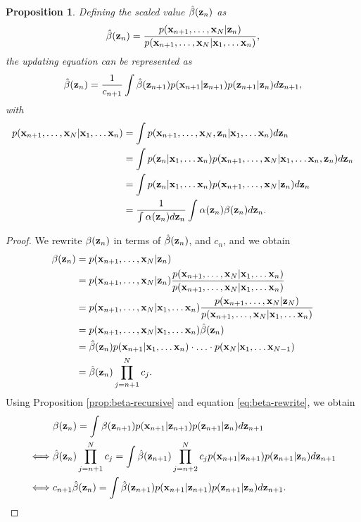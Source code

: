\documentclass[12pt, oneside]{book}
\numberwithin{equation}{section}
\newcommand{\x}{{\bf x}}
\newcommand{\z}{{\bf z}}
\newtheorem{proposition}{Proposition}[section]
\begin{document}
{\begin{proposition} \label{prop:beta-hat}
	Defining the scaled value $\hat\beta(\z_n)$ as
	\begin{equation}
		\hat\beta(\z_n) = \frac{p(\x_{n+1}, \ldots, \x_N \vert \z_n)}{p(\x_{n+1}, \ldots, \x_N \vert \x_1, \ldots \x_n)},
	\end{equation}
	the updating equation can be represented as
	\begin{equation}
		\hat\beta(\z_n) = \frac{1}{c_{n+1}}\int \hat\beta(\z_{n+1})p(\x_{n+1}\vert\z_{n+1})p(\z_{n+1}\vert\z_n) d\z_{n+1},
	\end{equation}
	with
	\begin{align}
		p(\x_{n+1}, \ldots, \x_N \vert \x_1, \ldots \x_n) &= \int p(\x_{n+1}, \ldots, \x_N, \z_n \vert \x_1, \ldots \x_n) d\z_n\\
		&= \int p(\z_n \vert \x_1, \ldots \x_n) p(\x_{n+1}, \ldots, \x_N \vert \x_1, \ldots \x_n, \z_n) d\z_n \nonumber\\
		&= \int p(\z_n \vert \x_1, \ldots \x_n) p(\x_{n+1}, \ldots, \x_N \vert \z_n) d\z_n\\
		&= \frac{1}{\int \alpha(\z_n) d\z_n} \int \alpha(\z_n) \beta(\z_n) d\z_n.
	\end{align}
\end{proposition}

\begin{proof}
	We rewrite $\beta(\z_n)$ in terms of $\hat\beta(\z_n)$, and $c_n$, and we obtain
	\begin{align}
		\beta(\z_n) &= p(\x_{n+1}, \ldots, \x_N \vert \z_n)\\
		&= p(\x_{n+1}, \ldots, \x_N \vert \z_n) \frac{p(\x_{n+1}, \ldots, \x_N \vert \x_1, \ldots \x_n)}{p(\x_{n+1}, \ldots, \x_N \vert \x_1, \ldots \x_n)} \\
		&= p(\x_{n+1}, \ldots, \x_N \vert \x_1, \ldots \x_n) \frac{p(\x_{n+1}, \ldots, \x_N \vert \z_N)}{p(\x_{n+1}, \ldots, \x_N \vert \x_1, \ldots \x_n)}\\
		&= p(\x_{n+1}, \ldots, \x_N \vert \x_1, \ldots \x_n) \hat\beta(\z_n)\\
		&= \hat\beta(\z_n) p(\x_{n+1} \vert \x_1, \ldots \x_n) \cdot \ldots \cdot p(\x_{N} \vert \x_1, \ldots \x_{N-1})\\
		&= \hat\beta(\z_n) \prod_{j=n+1}^N c_j \label{eq:beta-rewrite}.
	\end{align}
	Using Proposition \ref{prop:beta-recursive} and equation \eqref{eq:beta-rewrite}, we obtain
	\begin{align}
		&\beta(\z_n) = \int  \beta(\z_{n+1})p(\x_{n+1}\vert \z_{n+1}) p(\z_{n+1}\vert \z_n) d\z_{n+1}\\
		\iff& \hat\beta(\z_n) \prod_{j=n+1}^N c_j = \int \hat\beta(\z_{n+1}) \prod_{j=n+2}^N c_jp(\x_{n+1}\vert \z_{n+1}) p(\z_{n+1}\vert \z_n) d\z_{n+1}\\
		\iff& c_{n+1} \hat\beta(\z_n) = \int  \hat\beta(\z_{n+1}) p(\x_{n+1}\vert \z_{n+1}) p(\z_{n+1}\vert \z_n) d\z_{n+1}.
	\end{align}
\end{proof}

}
\end{document}
